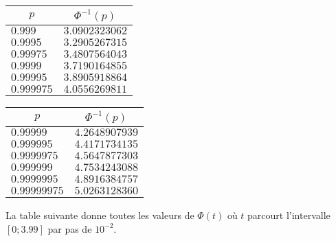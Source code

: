 \begin{center}
\begin{small}
\begin{center}
\begin{tabular}{ll}
				\midrule  
			\end{tabular}
			\hspace*{1.25cm}
			\begin{tabular}{ll}
				\multicolumn{1}{c}{$p$}& \multicolumn{1}{c}{$\Phi^{-1}(p)$} \\ \midrule
				$0.999$ & $3.0902323062$\\
				$0.9995$ & $3.2905267315$\\
				$0.99975$ & $3.4807564043$\\
				$0.9999$ & $3.7190164855$\\
				$0.99995$ & $3.8905918864$\\
				$0.999975$ & $4.0556269811$\\
				
				\midrule  
			\end{tabular}
			\hspace*{1.25cm}
			\begin{tabular}{ll}
				\multicolumn{1}{c}{$p$}& \multicolumn{1}{c}{$\Phi^{-1}(p)$} \\ \midrule
				$0.99999$ & $4.2648907939$\\
				$0.999995$ & $4.4171734135$\\
				$0.9999975$ & $4.5647877303$\\
				$0.999999$ & $4.7534243088$\\
				$0.9999995$ & $4.8916384757$\\
				$0.99999975$ & $5.0263128360$\\
				
				\midrule  
			\end{tabular}
		\end{center}
	\end{small}
\end{center}

La table suivante donne toutes les valeurs de $\Phi(t)$ où $t$ parcourt l'intervalle $[0;3.99]$ par pas de $10^{-2}$.

